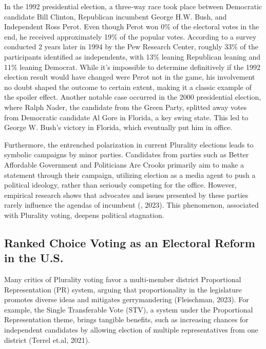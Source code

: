 In the 1992 presidential election, a three-way race took place between Democratic candidate Bill Clinton, Republican incumbent George H.W. Bush, and Independent Ross Perot. Even though Perot won 0\% of the electoral votes in the end, he received approximately 19\% of the popular votes. According to a survey conducted 2 years later in 1994 by the Pew Research Center, roughly 33\% of the participants identified as independents, with 13\% leaning Republican leaning and 11\% leaning Democrat. While it’s impossible to determine definitively if the 1992 election result would have changed were Perot not in the game, his involvement no doubt shaped the outcome to certain extent, making it a classic example of the spoiler effect. Another notable case occurred in the 2000 presidential election, where Ralph Nader, the candidate from the Green Party, splitted away votes from Democratic candidate Al Gore in Florida, a key swing state. This led to George W. Bush’s victory in Florida, which eventually put him in office.

Furthermore, the entrenched polarization in current Plurality elections leads to symbolic campaigns by minor parties. Candidates from parties such as Better Affordable Government and Politicians Are Crooks primarily aim to make a statement through their campaign, utilizing election as a media agent to push a political ideology, rather than seriously competing for the office. However, empirical research shows that advocates and issues presented by these parties rarely influence the agendas of incumbent (\cite{klepetar_nodate}, 2023). This phenomenon, associated with Plurality voting, deepens political stagnation. 

\subsection{Ranked Choice Voting as an Electoral Reform in the U.S.}

Many critics of Plurality voting favor a multi-member district Proportional Representation (PR) system, arguing that proportionality in the legislature promotes diverse ideas and mitigates gerrymandering (Fleischman, 2023). For example, the Single Transferable Vote (STV), a system under the Proportional Representation theme, brings tangible benefits, such as increasing chances for independent candidates by allowing election of multiple representatives from one district (Terrel et.al, 2021). 

